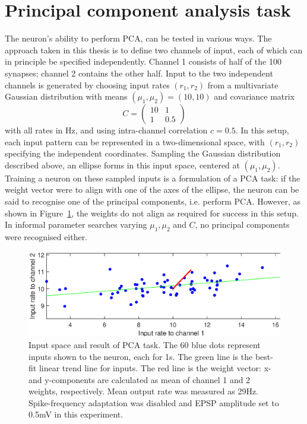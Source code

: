 \documentclass[a4paper,12pt]{report}
\theoremstyle{definition}
\begin{document}
\section{Principal component analysis task} %
The neuron's ability to perform PCA, can be tested in various ways. The approach taken in this thesis is to define two channels of input, each of which can in principle be specified independently. Channel 1 consists of half of the 100 synapses; channel 2 contains the other half. Input to the two independent channels is generated by choosing input rates $(r_1, r_2)$ from a multivariate Gaussian distribution with means $(\mu_1, \mu_2)=(10,10)$ and covariance matrix
$$
C =
\begin{pmatrix}
  10 & 1 \\
  1 & 0.5
 \end{pmatrix}
$$
with all rates in Hz, and using intra-channel correlation $c=0.5$. In this setup, each input pattern can be represented in a two-dimensional space, with $(r_1, r_2)$ specifying the independent coordinates. Sampling the Gaussian distribution described above, an ellipse forms in this input space, centered at $(\mu_1, \mu_2)$. Training a neuron on these sampled inputs is a formulation of a PCA task: if the weight vector were to align with one of the axes of the ellipse, the neuron can be said to recognise one of the principal components, i.e. perform PCA. However, as shown in Figure~\ref{fig:exp10_pca}, the weights do not align as required for success in this setup. In informal parameter searches varying $\mu_1, \mu_2$ and $C$, no principal components were recognised either.

\begin{figure}[!htb]
    \centering
    \includegraphics[width=\textwidth]{figures/exp10_pca.eps}
    \caption{Input space and result of PCA task. The 60 blue dots represent inputs shown to the neuron, each for 1s. The green line is the best-fit linear trend line for inputs. The red line is the weight vector: x- and y-components are calculated as mean of channel 1 and 2 weights, respectively. Mean output rate was measured as 29Hz. Spike-frequency adaptation was disabled and EPSP amplitude set to 0.5mV in this experiment.}
    \label{fig:exp10_pca}
\end{figure}
\end{document}
